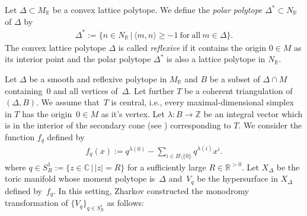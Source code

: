 \documentclass[pdftex]{sigma}
\numberwithin{equation}{section}
\begin{document}
\begin{Definition}
Let $\Delta \subset M_{\mathbb R}$ be a convex lattice polytope.
We def\/ine the {\it polar polytope} $\Delta^\ast \subset N_{\mathbb R}$ of $\Delta$ by
\begin{gather*}
\Delta^\ast:=\{ n \in N_{\mathbb R} \,|\, \langle m ,n \rangle \geq -1\ \mathrm{for\ all\ } m \in \Delta \}.
\end{gather*}
The convex lattice polytope $\Delta$ is called {\it reflexive} if it contains the origin $0 \in M$ as its interior point and the polar polytope $\Delta^\ast$ is also a lattice polytope in $N_{\mathbb R}$.
\end{Definition}

Let $\Delta$ be a smooth and ref\/lexive polytope in $M_{\mathbb R}$ and $B$ be a subset of $\Delta \cap M$ containing~$0$ and all vertices of~$\Delta$.
Let further $T$ be a coherent triangulation of $(\Delta, B)$. We assume that~$T$ is central, i.e., every maximal-dimensional simplex in $T$ has the origin~$0 \in M$ as it's vertex. Let $\lambda \colon B \to {\mathbb Z}$ be an integral vector which is in the interior of the secondary cone (see \cite[Chap\-ter~7, Def\/inition~1.4]{MR2394437}) corresponding to $T$. We consider the function $f_q$ def\/ined by
\begin{gather*}
f_q(x):=q^{\lambda(0)}-\sum_{i \in B \setminus \{0\}} q^{\lambda(i)}x^{i}.
\end{gather*}
where $q \in S_R^1:=\{ z \in {\mathbb C} \,|\, |z|=R \}$ for a suf\/f\/iciently large $R \in {\mathbb R}^{>0}$. Let $X_\Delta$ be the toric manifold whose moment polytope is~$\Delta$ and~$V_q$ be the hypersurface in $X_\Delta$ def\/ined by~$f_q$. In this setting, Zharkov constructed the monodromy transformation of $\{V_q\}_{q \in S_R^1}$ as follows:
\end{document}
